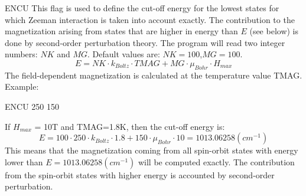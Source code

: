 \begin{keywordlist}
\item[ENCU]
This flag is used to define the cut-off energy for the lowest states for which
Zeeman interaction is taken into account exactly. The contribution to the magnetization
arising from states that are higher in energy than $E$ (see below) is done by
second-order perturbation theory. The program will read two integer
numbers: $NK$ and $MG$. Default values are: $NK=100$,$MG=100$.
\begin{displaymath}
E=NK \cdot k_{Boltz} \cdot TMAG + MG \cdot \mu_{Bohr} \cdot H_{max}
\end{displaymath}
The field-dependent magnetization is calculated at the temperature value TMAG.
Example:
\begin{inputlisting}
ENCU
250  150
\end{inputlisting}
If $H_{max}$ = 10T and TMAG=1.8K, then the cut-off energy is:
\begin{displaymath}
 E=100 \cdot 250 \cdot k_{Boltz} \cdot 1.8 + 150 \cdot \mu_{Bohr} \cdot 10 = 1013.06258 (cm^{-1})
\end{displaymath}
This means that the magnetization coming from all spin-orbit states with energy lower
than $E=1013.06258 (cm^{-1})$ will be computed exactly. The contribution from the
spin-orbit states with higher energy is accounted by second-order perturbation.





\end{keywordlist}
